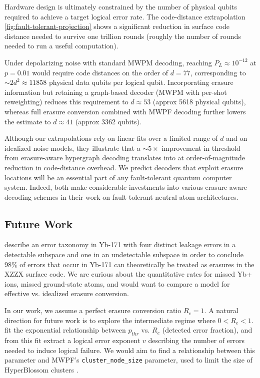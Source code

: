 \documentclass[11pt, notitlepage, letterpaper]{article}
\begin{document}
Hardware design is ultimately constrained by the number of physical qubits required to achieve a target logical error rate. The code-distance extrapolation \autoref{fig:fault-tolerant-projection} shows a significant reduction in surface code distance needed to survive one trillion rounds (roughly the number of rounds needed to run a useful computation).

Under depolarizing noise with standard MWPM decoding, reaching $P_L \approx 10^{-12}$ at $p=0.01$ would require code distances on the order of $d = 77$, corresponding to $\sim 2d^2 \approx 11858 $ physical data qubits per logical qubit. Incorporating erasure information but retaining a graph-based decoder (MWPM with per-shot reweighting) reduces this requirement to $d \approx 53$ (approx 5618 physical qubits), whereas full erasure conversion combined with MWPF decoding further lowers the estimate to $d \approx 41$ (approx 3362 qubits).

Although our extrapolations rely on linear fits over a limited range of $d$ and on idealized noise models, they illustrate that a $\sim 5\times$ improvement in threshold from erasure-aware hypergraph decoding translates into at order-of-magnitude reduction in code-distance overhead. We predict decoders that exploit erasure locations will be an essential part of any fault-tolerant quantum computer system. Indeed, \citeauthor{bluvstein_architectural_2025} \citeauthor{baranes_leveraging_2025} both make considerable investments into various erasure-aware decoding schemes in their work on fault-tolerant neutral atom architectures.


\subsection{Future Work}
\citeauthor{wu_erasure_2022} describe an error taxonomy in Yb-171 with four distinct leakage errors in a detectable subspace and one in an undetectable subspace in order to conclude 98\% of errors that occur in Yb-171 can theoretically be treated as erasures in the XZZX surface code. We are curious about the quantitative rates for missed Yb+ ions, missed ground-state atoms, and would want to compare a model for effective vs. idealized erasure conversion.

In our work, we assume a perfect erasure conversion ratio $R_e=1$. A natural direction for future work is to explore the intermediate regime where $0 < R_{e} < 1$. \citeauthor{wu_erasure_2022} fit the exponential relationship between $p_{thr}$ vs. $R_e$ (detected error fraction), and from this fit extract a logical error exponent $v$ describing the number of errors needed to induce logical failure. We would aim to find a relationship between this parameter and MWPF's \verb|cluster_node_size| parameter, used to limit the size of HyperBlossom clusters \cite{wu_minimum-weight_2025}.
\end{document}
